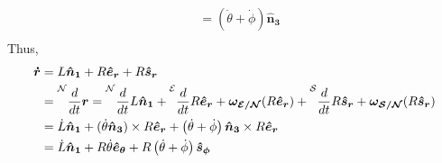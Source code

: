 \begin{example}
\[\begin{aligned}
			                                          & = (\dot{ \theta} + \dot{ \phi}) \bm{{\hat{n}_{3}}}                                    \\
		\end{aligned}
	\]
	Thus,
	\[
		\begin{aligned}
			\bm{\dot{r} } & = L \bm{{\hat{n}_{1}}} + R \bm{{\hat{e}_{r}}} + R \bm{{\hat{s}_{r}}}                                                                                                                                                                              \\
			              & = \prescript{\mathcal{N}}{}{\frac{d}{dt}\bm{r}} = \prescript{\mathcal{N}}{}{\frac{d}{dt}} L \bm{{\hat{n}_{1}}} + \prescript{\mathcal{E}}{}{\frac{d}{dt}}R \bm{{\hat{e}_{r}}} + \bm{\omega _{\mathcal{E} / \mathcal{N} }} (R \bm{{\hat{e}_{r}}}) +
			\prescript{\mathcal{S}}{}{\frac{d}{dt}}R \bm{{\hat{s}_{r}}} + \bm{\omega _{\mathcal{S} / \mathcal{N} }} (R \bm{{\hat{s}_{r}}})                                                                                                                                    \\
			              & = \dot{L} \bm{{\hat{n}_{1}}} + (\dot{\theta }\bm{{\hat{n}_{3}}} ) \times R \bm{{\hat{e}_{r}}} + \left(
			\dot{\theta}+ \dot{\phi }\right)  \bm{{\hat{n}_{3}}} \times R \bm{{\hat{e}_{r}}}
			\\
			              & = \dot{L}\bm{{\hat{n}_{1}}} + R \dot{\theta } \bm{{\hat{e}_{\theta }}} + R \left(
			\dot{\theta } + \dot{\phi }
			\right)  \bm{{\hat{s}_{\phi }}}
		\end{aligned}
	\]
\end{example}

